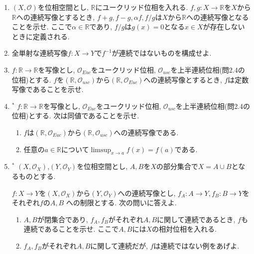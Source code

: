 \documentclass[dvipdfmx,a4paper,11pt]{article}
\newcommand{\R}{\mathbb{R}}
\theoremstyle{definition}
\begin{document}
\begin{enumerate}[ label=\textbf{問}3.\arabic*]
\item $(X, \mathscr{O})$を位相空間とし, $\R$にユークリッド位相を入れる. $f,g :  X \rightarrow \R$を$X$から$\R$への連続写像とするとき, $f +g, f-g, \alpha f, f/g$は$X$から$\R$への連続写像となることを示せ. ここで$\alpha \in \R$であり, $f/g$は$g(x)=0$となる$x \in X$が存在しないときに定義される. 



 \item 全単射な連続写像$f :  X \rightarrow Y$で$f^{-1}$が連続ではないものを構成せよ. 
 
	

\item $f : \R \rightarrow \R$を写像とし, $\mathscr{O}_{Euc}$をユークリッド位相, $\mathscr{O}_{usc}$を上半連続位相(問2.4の位相)とする. $f$を$(\R, \mathscr{O}_{usc})$から$(\R, \mathscr{O}_{Euc})$への連続写像とするとき, $f$は定数写像であることを示せ.

\item $^*$ $f : \R \rightarrow \R$を写像とし, $\mathscr{O}_{Euc}$をユークリッド位相, $\mathscr{O}_{usc}$を上半連続位相(問2.4の位相)とする. 次は同値であることを示せ.
	\begin{enumerate}
	\item $f$は$(\R, \mathscr{O}_{Euc})$から$(\R, \mathscr{O}_{usc})$への連続写像である.
	\item 任意の$a \in \R$について$\limsup_{x \rightarrow a} f(x) =f(a)$である.
	\end{enumerate}
 
 \item$^*$  $(X, \mathscr{O}_X)$,$(Y, \mathscr{O}_Y)$を位相空間とし, $A,B$を$X$の部分集合で$X = A \cup B$となるものとする.
 
 $f : X \rightarrow Y$を$(X, \mathscr{O}_X)$から$(Y, \mathscr{O}_Y)$への連続写像とし, $f_{A}: A \rightarrow Y, f_{B}: B \rightarrow Y$をそれぞれ$f$の$A, B$ への制限とする. 
 次の問いに答えよ.
	\begin{enumerate}
	\item $A,B$が閉集合であり, $f_A,f_B$がそれぞれ$A,B$に関して連続であるとき, $f$も連続であることを示せ. ここで$A,B$には$X$の相対位相を入れる.
	\item $f_A,f_B$がそれぞれ$A,B$に関して連続だが, $f$は連続ではない例をあげよ.
	\end{enumerate}


\end{enumerate}
\end{document}
